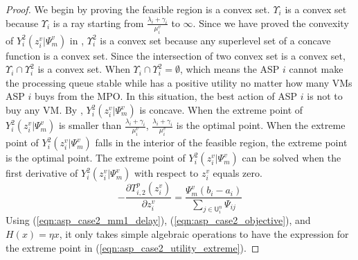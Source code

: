 \documentclass[conference]{IEEEtran}
\begin{document}
\begin{proof}
We begin by proving the feasible region is a convex set. $\Upsilon_i$ is a convex set because $\Upsilon_i$ is a ray starting from $\frac{\lambda_i+\gamma_i}{\mu_i^v}$ to $\infty$. Since we have proved the convexity of $Y_i^2(z_i^v|\Psi_m^v)$ in , $\Upsilon_i^2$ is a convex set because any superlevel set of a concave function is a convex set. Since the intersection of two convex set is a convex set, $\Upsilon_i \cap \Upsilon_i^2$ is a convex set. When $\Upsilon_i \cap \Upsilon_i^2 = \emptyset$, which means the ASP $i$ cannot make the processing queue stable while has a positive utility no matter how many VMs ASP $i$ buys from the MPO. In this situation, the best action of ASP $i$ is not to buy any VM. By , $Y_i^2(z_i^v|\Psi_m^v)$ is concave. When the extreme point of $Y_i^2(z_i^v|\Psi_m^v)$ is smaller than $\frac{\lambda_i+\gamma_i}{\mu_i^v}$, $\frac{\lambda_i+\gamma_i}{\mu_i^v}$ is the optimal point. When the extreme point of $Y_i^2(z_i^v|\Psi_m^v)$ falls in the interior of the feasible region, the extreme point is the optimal point. The extreme point of $Y_i^2(z_i^v|\Psi_m^v)$ can be solved when the first derivative of $Y_i^2(z_i^v|\Psi_m^v)$ with respect to $z_i^v$ equals zero.
\begin{equation} \label{eqn:asp_case2_utility_first_deriv}
-\frac{\partial T_{i,2}^p(z_i^v)}{\partial z_i^v} = \frac{\Psi_m^v (b_i - a_i)}{\sum_{j \in \mathsf{U}_i^n} \Psi_{ij}}
\end{equation}
Using (\ref{eqn:asp_case2_mm1_delay}), (\ref{eqn:asp_case2_objective}), and $H(x)=\eta x$, it only takes simple algebraic operations to have the expression for the extreme point in (\ref{eqn:asp_case2_utility_extreme}). \qedhere
\end{proof}
\end{document}
